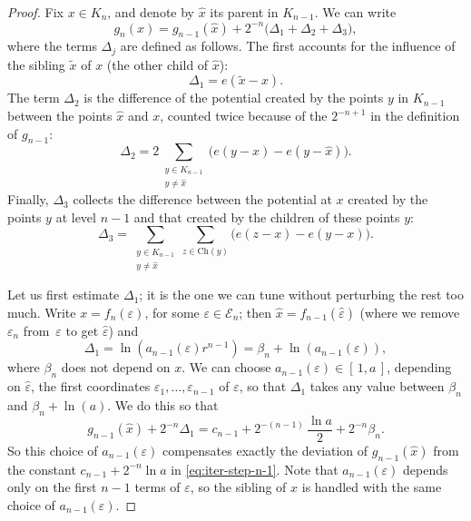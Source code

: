 \documentclass[10pt]{amsart}
\let\wt\widetilde
\let\wh\widehat
\numberwithin{equation}{section}
\theoremstyle{plain}
\theoremstyle{definition}
\newcommand{\cE}{{\mathcal E}}
\begin{document}
\begin{proof}
Fix $x\in K_n$, and denote by $\wh x$ its parent in $K_{n-1}$.
We can write
\begin{equation*}
g_n(x) = g_{n-1}(\wh x) + 2^{-n}\big (\Delta_1 + \Delta_2 + \Delta_3 \big),
\end{equation*}
where the terms $\Delta_j$ are defined as follows.
The first accounts for the influence of the sibling $\wt x$ of $x$ (the other child of $\wh x$):
\begin{equation}\label{eq:Delta1-def}
\Delta_1 = e(\wt x-x).
\end{equation}
The term $\Delta_2$ is the difference of the potential created by the points $y$ in $K_{n-1}$ between
the points $\wh x$ and $x$, counted twice because of the $2^{-n+1}$ in the definition of $g_{n-1}$:
\begin{equation}\label{eq:Delta2-def}
\Delta_2 = 2 \sum\limits_{\substack{ y \in K_{n-1}\\ y \neq \wh x}} \big (e( y-x) - e( y-\wh x)\big ).
\end{equation}
Finally, $\Delta_3$ collects the difference between the potential at $x$ created by the points $y$ at level $n-1$ and that created by the children of these points $y$:
\begin{equation}\label{eq:Delta3-def}
\Delta_3 = \sum\limits_{\substack{ y \in K_{n-1}\\ y \neq \wh x}} \sum_{z\in \mathrm{Ch}(y)} \big ( e(z-x) - e(y-x)\big ).
\end{equation}

Let us first estimate $\Delta_1$;
it is the one we can tune without perturbing the rest too much. Write $x= f_n(\varepsilon)$,
for some $\varepsilon \in \cE_n$; then $\wh x = f_{n-1}(\wh\varepsilon)$ (where we remove $\varepsilon_n$
from~$\varepsilon$ to get $\wh\varepsilon$) and
\begin{equation*}
\Delta_1 = \ln (a_{n-1}(\varepsilon)r^{n-1}) = \beta_n + \ln (a_{n-1}(\varepsilon)),
\end{equation*}
where $\beta_n$ does not depend on $x$. We can choose $a_{n-1}(\varepsilon) \in [\, 1,a\, ]$,
depending on $\wh \varepsilon$, \ie the first coordinates $\varepsilon_1, \ldots, \varepsilon_{n-1}$ of
$\varepsilon$, so that $\Delta_1$ takes any value between $\beta_n$ and $\beta_n + \ln(a)$.
We do this so that
\begin{equation*}
g_{n-1}(\wh x) + 2^{-n}\Delta_1 = c_{n-1} + 2^{-(n-1)}\,\dfrac{ \ln a}{2} + 2^{-n}\beta_n.
\end{equation*}
So this choice of $a_{n-1}(\varepsilon)$ compensates exactly the deviation of $g_{n-1}(\wh x)$ from the constant
$c_{n-1} +2^{-n} \ln a$ in \eqref{eq:iter-step-n-1}. Note that $a_{n-1}(\varepsilon)$ depends only on the
first $n-1$ terms of $\varepsilon$, so the sibling of $x$ is handled with the same choice of $a_{n-1}(\varepsilon)$.


\end{proof}
\end{document}
